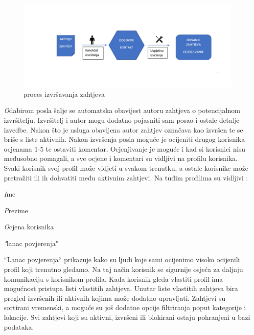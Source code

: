 		\begin{figure}[H]
			\includegraphics[scale=0.7]{slike/projekt2.png} %
			\centering
			\caption {proces izvršavanja zahtjeva}
			\label{fig:promjene}
		\end{figure}

        \textit Odabirom posla šalje se automatska obavijest autoru zahtjeva o potencijalnom izvršitelju. Izvršitelj i autor mogu dodatno pojasniti sam posao i ostale detalje izvedbe. Nakon što je usluga obavljena autor zahtjev označava kao izvršen te se briše s liste aktivnih.  
        \newline
Nakon izvršenja posla moguće je ocijeniti drugog korisnika ocjenama 1-5 te ostaviti komentar. Ocjenjivanje je moguće i kad si korisnici nisu međusobno pomagali, a sve ocjene i komentari su vidljivi na profilu korisnika.
        \newline
Svaki korisnik svoj profil može vidjeti u svakom trenutku, a ostale korisnike može pretražiti ili ih dohvatiti među aktivnim zahtjevi. Na tuđim profilima su vidljivi :
		
		\begin{packed_item}
			\item \textit Ime
			\item \textit Prezime
			\item \textit Ocjena korisnika
			\item \textit "lanac povjerenja"

		\end{packed_item}
		
		
“Lanac povjerenja“ prikazuje kako su ljudi koje sami ocijenimo visoko ocijenili profil koji trenutno gledamo. Na taj način korisnik se sigurnije osjeća za daljnju komunikaciju s korisnikom profila.
\newline
Kada korisnik gleda vlastiti profil ima mogućnost pristupa listi vlastitih zahtjeva. Unutar liste vlastitih zahtjeva bira pregled izvršenih ili aktivnih kojima može dodatno upravljati. Zahtjevi su sortirani vremenski, a moguće su još dodatne opcije filtriranja poput kategorije i lokacije. Svi zahtjevi koji su aktivni, izvršeni ili blokirani ostaju pohranjeni u bazi podataka.
\newline

